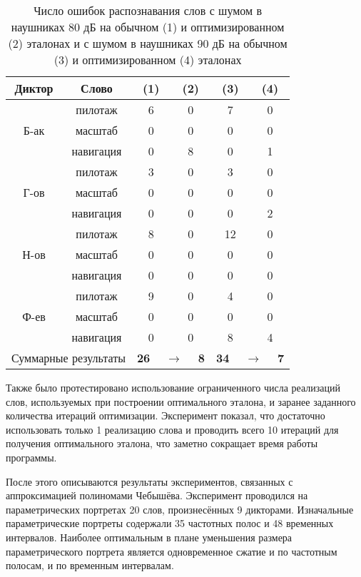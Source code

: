 \begin{table}[h]
	\centering
	\caption{Число ошибок распознавания слов с шумом в наушниках 80 дБ на обычном (1) и оптимизированном (2) эталонах и с шумом в наушниках 90 дБ на обычном (3) и оптимизированном (4) эталонах}
	\label{tab:3_2}
	\begin{tabular}{| c | c | c | c | c | c |}
		\hline
		\phantom{000}Диктор\phantom{000}& Слово & \phantom{00} (1) \phantom{00} & \phantom{00} (2) \phantom{00} & \phantom{00} (3) \phantom{00} & \phantom{00} (4) \phantom{00} \\
		\hline
				& пилотаж	& 6 & 0 & 7 & 0 \\
		Б-ак	& масштаб	& 0 & 0 & 0 & 0 \\
				& навигация & 0 & 8 & 0 & 1 \\
		\hline
				& пилотаж	& 3 & 0 & 3 & 0 \\
		Г-ов	& масштаб   & 0 & 0 & 0 & 0 \\
				& навигация & 0 & 0 & 0 & 2 \\
		\hline
				& пилотаж	& 8 & 0 & 12& 0 \\
		Н-ов	& масштаб   & 0 & 0 & 0 & 0 \\
				& навигация & 0 & 0 & 0 & 0 \\
		\hline
				& пилотаж	& 9 & 0 & 4 & 0 \\
		Ф-ев	& масштаб   & 0 & 0 & 0 & 0 \\
				& навигация & 0 & 0 & 8 & 4 \\
		\hline
		\multicolumn{2}{|c|}{Суммарные результаты} & \multicolumn{2}{c|}{\textbf{26} $\quad\longrightarrow\quad$ \textbf{8}} & \multicolumn{2}{c|}{\textbf{34} $\quad\longrightarrow\quad$ \textbf{7}} \\
		\hline
	\end{tabular}
\end{table}

Также было протестировано использование ограниченного числа реализаций слов, используемых при построении оптимального эталона, и заранее заданного количества итераций оптимизации.
Эксперимент показал, что достаточно использовать только 1 реализацию слова и проводить всего 10 итераций для получения оптимального эталона, что заметно сокращает время работы программы.

После этого описываются результаты экспериментов, связанных с аппроксимацией полиномами Чебышёва.
Эксперимент проводился на параметрических портретах 20 слов, произнесённых 9 дикторами.
Изначальные параметрические портреты содержали 35 частотных полос и 48 временных интервалов.
Наиболее оптимальным в плане уменьшения размера параметрического портрета является одновременное сжатие и по частотным полосам, и по временным интервалам.

